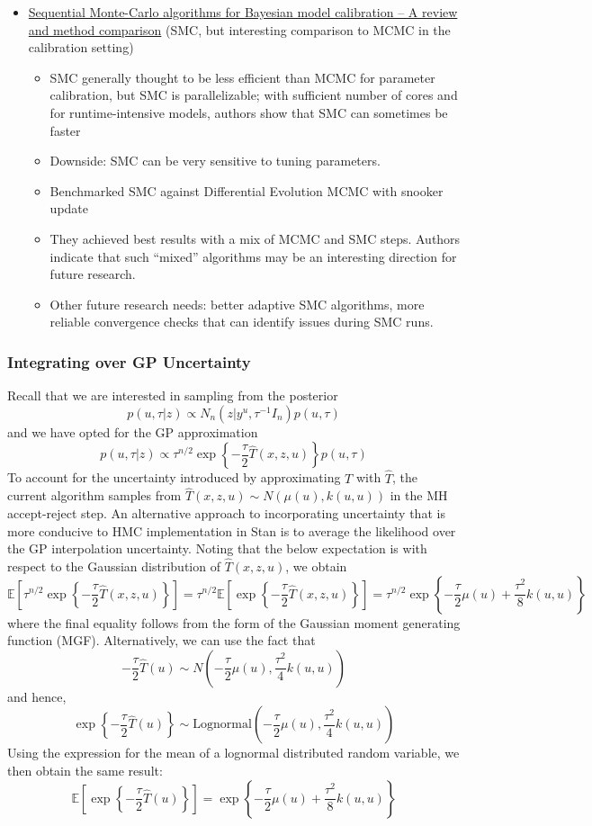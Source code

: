 \documentclass[12pt]{article}
\newcommand{\E}{\mathbb{E}}
\begin{document}
\begin{itemize}
\begin{itemize}
	\end{itemize}
\item \href{https://www.sciencedirect.com/science/article/pii/S0304380021001708}{Sequential Monte-Carlo algorithms for Bayesian model calibration – A review and method comparison} 
(SMC, but interesting comparison to MCMC in the calibration setting)
	\begin{itemize}
	\item SMC generally thought to be less efficient than MCMC for parameter calibration, but SMC is parallelizable; with sufficient number of cores and for runtime-intensive models, authors show that SMC can sometimes be faster
	\item Downside: SMC can be very sensitive to tuning parameters.
	\item Benchmarked SMC against Differential Evolution MCMC with snooker update
	\item They achieved best results with a mix of MCMC and SMC steps. Authors indicate that such ``mixed'' algorithms may be an interesting direction for future research.  
	\item Other future research needs: better adaptive SMC algorithms, more reliable convergence checks that can identify issues during SMC runs. 
	\end{itemize}
\end{itemize}

\subsubsection{Integrating over GP Uncertainty}
Recall that we are interested in sampling from the posterior
\[p(u, \tau|z) \propto N_n(z|y^u, \tau^{-1} I_n)p(u, \tau)\]
and we have opted for the GP approximation 
\[p(u, \tau|z) \propto \tau^{n/2} \exp\left\{-\frac{\tau}{2} \hat{T}(x, z, u) \right\}p(u, \tau)\]
To account for the uncertainty introduced by approximating $T$ with $\hat{T}$, the current algorithm samples from $\hat{T}(x, z, u) \sim N(\mu(u), k(u, u))$ in the MH 
accept-reject step. An alternative approach to incorporating uncertainty that is more conducive to HMC implementation in Stan is to average the likelihood over the GP 
interpolation uncertainty. Noting that the below expectation is with respect to the Gaussian distribution of $\hat{T}(x, z, u)$, we obtain 
\[\E \left[\tau^{n/2} \exp\left\{-\frac{\tau}{2} \hat{T}(x, z, u)\right\} \right] = \tau^{n/2} \E \left[ \exp\left\{-\frac{\tau}{2} \hat{T}(x, z, u)\right\} \right] = \tau^{n/2} \exp\left\{-\frac{\tau}{2}\mu(u) + \frac{\tau^2}{8} k(u, u)\right\}\]
where the final equality follows from the form of the Gaussian moment generating function (MGF). Alternatively, we can use the fact that 
\[-\frac{\tau}{2} \hat{T}(u) \sim N\left(-\frac{\tau}{2}\mu(u), \frac{\tau^2}{4} k(u, u) \right)\]
and hence, 
\[\exp\left\{-\frac{\tau}{2} \hat{T}(u)\right\} \sim \text{Lognormal}\left(-\frac{\tau}{2}\mu(u), \frac{\tau^2}{4} k(u, u) \right)\]
Using the expression for the mean of a lognormal distributed random variable, we then obtain the same result:
\[\E\left[\exp\left\{-\frac{\tau}{2} \hat{T}(u)\right\}\right] = \exp\left\{-\frac{\tau}{2}\mu(u) + \frac{\tau^2}{8}k(u, u)\right\}\]
\end{document}
